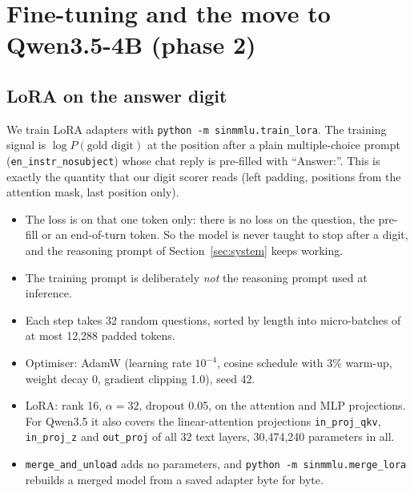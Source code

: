 \documentclass[10pt,a4paper]{article}
\newcommand{\cond}[1]{\texttt{#1}}
\begin{document}
\section{Fine-tuning and the move to Qwen3.5-4B (phase 2)}\label{sec:finetune}
\subsection{LoRA on the answer digit}
We train LoRA adapters \cite{hu2022lora} with \texttt{python -m sinmmlu.train\_lora}. The training signal is
$\log P(\text{gold digit})$ at the position after a plain multiple-choice prompt (\cond{en\_instr\_nosubject}) whose
chat reply is pre-filled with ``Answer:\textvisiblespace''. This is exactly the quantity that our digit scorer reads
(left padding, positions from the attention mask, last position only).
\begin{itemize}
\item The loss is on that one token only: there is no loss on the question, the pre-fill or an end-of-turn token. So
the model is never taught to stop after a digit, and the reasoning prompt of Section~\ref{sec:system} keeps working.
\item The training prompt is deliberately \emph{not} the reasoning prompt used at inference.
\item Each step takes 32 random questions, sorted by length into micro-batches of at most 12,288 padded tokens.
\item Optimiser: AdamW (learning rate $10^{-4}$, cosine schedule with 3\% warm-up, weight decay 0, gradient clipping
1.0), seed 42.
\item LoRA: rank 16, $\alpha = 32$, dropout 0.05, on the attention and MLP projections. For Qwen3.5 it also covers the
linear-attention projections \texttt{in\_proj\_qkv}, \texttt{in\_proj\_z} and \texttt{out\_proj} of all 32 text layers,
30,474,240 parameters in all.
\item \texttt{merge\_and\_unload} adds no parameters, and \texttt{python -m sinmmlu.merge\_lora} rebuilds a merged model
from a saved adapter byte for byte.
\end{itemize}
\end{document}
